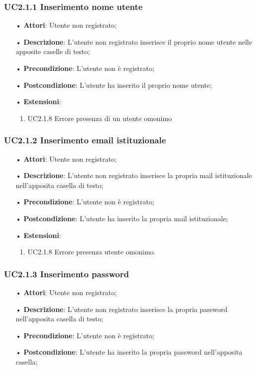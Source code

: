 \subsubsection{UC2.1.1 Inserimento nome utente}
\begin{itemize}
	\item[•] \textbf{Attori}: Utente non registrato;
	\item[•] \textbf{Descrizione}: L'utente non registrato inserisce il proprio nome utente nelle apposite caselle di testo;
	\item[•] \textbf{Precondizione}: L’utente non è registrato;
	\item[•] \textbf{Postcondizione}: L'utente ha inserito il proprio nome utente;
	\item[•] \textbf{Estensioni}:
		\begin{enumerate}
			\item UC2.1.8 Errore presenza di un utente omonimo
		\end{enumerate}
\end{itemize}

\subsubsection{UC2.1.2 Inserimento email istituzionale}
\begin{itemize}
	\item[•] \textbf{Attori}: Utente non registrato;
	\item[•] \textbf{Descrizione}: L'utente non registrato inserisce la propria mail istituzionale nell'apposita casella di testo;
	\item[•] \textbf{Precondizione}: L’utente non è registrato;
	\item[•] \textbf{Postcondizione}: L'utente ha inserito la propria mail istituzionale;	
	\item[•] \textbf{Estensioni}:
		\begin{enumerate}			
			\item UC2.1.8 Errore presenza utente omonimo.
		\end{enumerate}
\end{itemize}

\subsubsection{UC2.1.3 Inserimento password}
\begin{itemize}
	\item[•] \textbf{Attori}: Utente non registrato;
	\item[•] \textbf{Descrizione}: L'utente non registrato inserisce la propria password nell'apposita casella di testo;
	\item[•] \textbf{Precondizione}: L’utente non è registrato;
	\item[•] \textbf{Postcondizione}: L'utente ha inserito la propria password nell'apposita casella;
\end{itemize}

